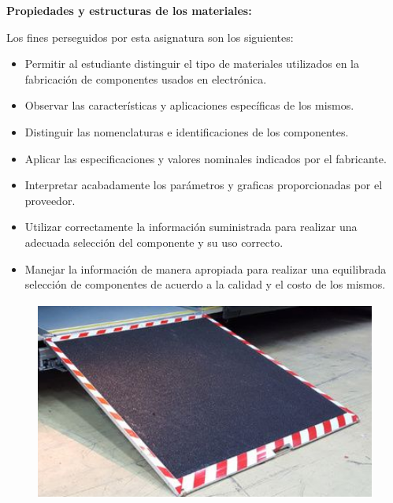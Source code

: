 \documentclass[12pt]{article}
\begin{document}
\vspace{\baselineskip}

\vspace{\baselineskip}
\textbf{Propiedades y estructuras de los materiales: }\par

Los fines perseguidos por esta asignatura son los siguientes: \par

\begin{itemize}
	\item Permitir al estudiante distinguir el tipo de materiales utilizados en la fabricación de componentes usados en electrónica.\par

	\item Observar las características y aplicaciones específicas de los mismos.\par

	\item Distinguir las nomenclaturas e identificaciones de los componentes.\par

	\item Aplicar las especificaciones y valores nominales indicados por el fabricante. \par

	\item Interpretar acabadamente los parámetros y graficas proporcionadas por el proveedor.\par

	\item Utilizar correctamente la información suministrada para realizar una adecuada selección del componente y su uso correcto. \par

	\item Manejar la información de manera apropiada para realizar una equilibrada selección de componentes de acuerdo a la calidad y el costo de los mismos.
\end{itemize}\par


\vspace{\baselineskip}



\begin{figure}[H]
	\begin{Center}
		\includegraphics[width=4.53in,height=2.58in]{./media/image8.png}
	\end{Center}
\end{figure}
\end{document}

